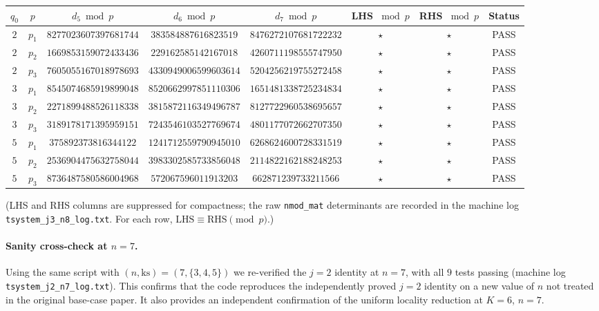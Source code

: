 \documentclass[11pt]{article}
\theoremstyle{definition}
\begin{document}
\begin{center}
\small
\begin{tabular}{cccccccc}
\toprule
$q_0$ & $p$ & $d_5 \bmod p$ & $d_6 \bmod p$ & $d_7 \bmod p$ & LHS $\bmod p$ & RHS $\bmod p$ & Status \\
\midrule
$2$ & $p_1$ & $8277023607397681744$ & $383584887616823519$  & $8476272107681722232$ & $\star$ & $\star$ & PASS \\
$2$ & $p_2$ & $1669853159072433436$ & $229162585142167018$  & $4260711198555747950$ & $\star$ & $\star$ & PASS \\
$2$ & $p_3$ & $7605055167018978693$ & $4330949006599603614$ & $5204256219755272458$ & $\star$ & $\star$ & PASS \\
$3$ & $p_1$ & $8545074685919899048$ & $8520662997851110306$ & $1651481338725234834$ & $\star$ & $\star$ & PASS \\
$3$ & $p_2$ & $2271899488526118338$ & $3815872116349496787$ & $8127722960538695657$ & $\star$ & $\star$ & PASS \\
$3$ & $p_3$ & $3189178171395959151$ & $7243546103527769674$ & $4801177072662707350$ & $\star$ & $\star$ & PASS \\
$5$ & $p_1$ & $375892373816344122$  & $1241712559790945010$ & $6268624600728331519$ & $\star$ & $\star$ & PASS \\
$5$ & $p_2$ & $2536904475632758044$ & $3983302585733856048$ & $2114822162188248253$ & $\star$ & $\star$ & PASS \\
$5$ & $p_3$ & $8736487580586004968$ & $572067596011913203$  & $662871239733211566$  & $\star$ & $\star$ & PASS \\
\bottomrule
\end{tabular}
\end{center}
\noindent (LHS and RHS columns are suppressed for compactness; the raw \texttt{nmod\_mat} determinants are recorded in the machine log \texttt{tsystem\_j3\_n8\_log.txt}. For each row, $\text{LHS} \equiv \text{RHS} \pmod{p}$.)

\paragraph{Sanity cross-check at $n = 7$.}  Using the same script with $(n, \text{ks}) = (7, \{3, 4, 5\})$ we re-verified the $j = 2$ identity at $n = 7$, with all $9$ tests passing (machine log \texttt{tsystem\_j2\_n7\_log.txt}). This confirms that the code reproduces the independently proved $j = 2$ identity on a new value of $n$ not treated in the original base-case paper. It also provides an independent confirmation of the uniform locality reduction at $K = 6$, $n = 7$.
\end{document}
